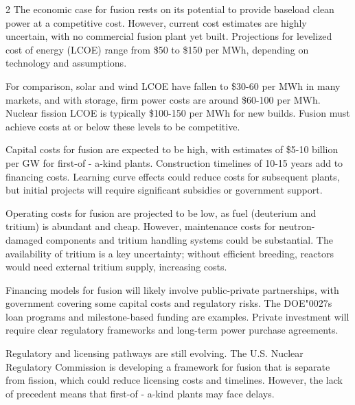 \documentclass[10pt,a4paper]{article}
\newcommand{\BOApos}{{\BOQuoteFont\char"0027}}
\begin{document}
\begin{multicols}{2}
{\small The economic case for fusion rests on its potential to provide baseload clean power at a competitive cost. However, current cost estimates are highly uncertain, with no commercial fusion plant yet built. Projections for levelized cost of energy (LCOE) range from \$50 to \$150 per MWh, depending on technology and assumptions.}\par
{\small For comparison, solar and wind LCOE have fallen to \$30-60 per MWh in many markets, and with storage, firm power costs are around \$60-100 per MWh. Nuclear fission LCOE is typically \$100-150 per MWh for new builds. Fusion must achieve costs at or below these levels to be competitive.}\par
{\small Capital costs for fusion are expected to be high, with estimates of \$5-10 billion per GW for first-of - a-kind plants. Construction timelines of 10-15 years add to financing costs. Learning curve effects could reduce costs for subsequent plants, but initial projects will require significant subsidies or government support.}\par
{\small Operating costs for fusion are projected to be low, as fuel (deuterium and tritium) is abundant and cheap. However, maintenance costs for neutron-damaged components and tritium handling systems could be substantial. The availability of tritium is a key uncertainty; without efficient breeding, reactors would need external tritium supply, increasing costs.}\par
{\small Financing models for fusion will likely involve public-private partnerships, with government covering some capital costs and regulatory risks. The DOE\BOApos{}s loan programs and milestone-based funding are examples. Private investment will require clear regulatory frameworks and long-term power purchase agreements.}\par
{\small Regulatory and licensing pathways are still evolving. The U.S. Nuclear Regulatory Commission is developing a framework for fusion that is separate from fission, which could reduce licensing costs and timelines. However, the lack of precedent means that first-of - a-kind plants may face delays.}\par
\end{multicols}
\label{chap:3:end}
\end{document}

